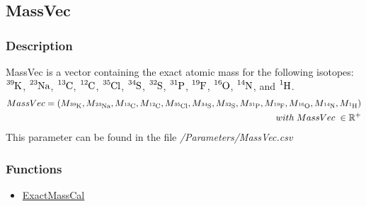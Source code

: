 \subsection{MassVec}\label{MassVec}
\subsubsection{Description}
MassVec is a vector containing the exact atomic mass for the following isotopes: $\ce{^{39}K}$, $\ce{^{23}Na}$, $\ce{^{13}C}$, $\ce{^{12}C}$, $\ce{^{35}Cl}$, $\ce{^{34}S}$, $\ce{^{32}S}$, $\ce{^{31}P}$, $\ce{^{19}F}$, $\ce{^{16}O}$, $\ce{^{14}N}$, and $\ce{^{1}H}$.
\begin{equation}
\begin{split}
MassVec=(M_{\ce{^{39}K}}, M_{\ce{^{23}Na}}, M_{\ce{^{13}C}}, M_{\ce{^{12}C}}, M_{\ce{^{35}Cl}}, M_{\ce{^{34}S}}, M_{\ce{^{32}S}}, M_{\ce{^{31}P}}, M_{\ce{^{19}F}}, M_{\ce{^{16}O}}, M_{\ce{^{14}N}}, M_{\ce{^{1}H}}) \\
\; with \; MassVec \;\in \mathbb{R}^{+}
\end{split}
\end{equation}
This parameter can be found in the file \textit{/Parameters/MassVec.csv}
\subsubsection{Functions}
\begin{itemize}
\item \hyperref[ExactMassCal]{ExactMassCal}
\end{itemize}

